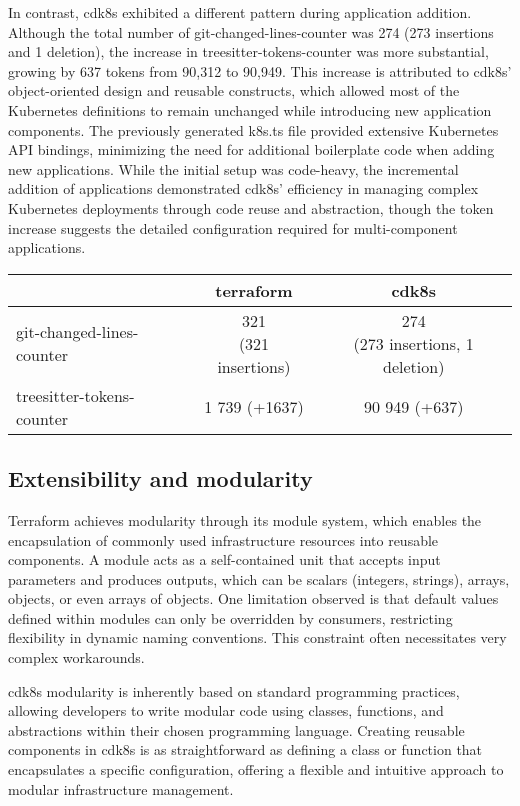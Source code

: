 \documentclass{article}
\begin{document}
In contrast, cdk8s exhibited a different pattern during application addition. Although the total number of git-changed-lines-counter was 274 (273 insertions and 1 deletion), the increase in treesitter-tokens-counter was more substantial, growing by 637 tokens from 90,312 to 90,949. This increase is attributed to cdk8s’ object-oriented design and reusable constructs, which allowed most of the Kubernetes definitions to remain unchanged while introducing new application components. The previously generated k8s.ts file provided extensive Kubernetes API bindings, minimizing the need for additional boilerplate code when adding new applications. While the initial setup was code-heavy, the incremental addition of applications demonstrated cdk8s’ efficiency in managing complex Kubernetes deployments through code reuse and abstraction, though the token increase suggests the detailed configuration required for multi-component applications.

\begin{center}
    \begin{tabular}{l | cc} 
        & terraform & cdk8s \\
        \hline
        git-changed-lines-counter & \makecell{321 \\ (321 insertions)} & \makecell{274 \\ (273 insertions, 1 deletion)} \\
        treesitter-tokens-counter & 1 739 (+1637) & 90 949 (+637) \\
    \end{tabular} 
\end{center}

\subsection{Extensibility and modularity}
Terraform achieves modularity through its module system, which enables the encapsulation of commonly used infrastructure resources into reusable components. A module acts as a self-contained unit that accepts input parameters and produces outputs, which can be scalars (integers, strings), arrays, objects, or even arrays of objects. One limitation observed is that default values defined within modules can only be overridden by consumers, restricting flexibility in dynamic naming conventions. This constraint often necessitates very complex workarounds.

cdk8s modularity is inherently based on standard programming practices, allowing developers to write modular code using classes, functions, and abstractions within their chosen programming language. Creating reusable components in cdk8s is as straightforward as defining a class or function that encapsulates a specific configuration, offering a flexible and intuitive approach to modular infrastructure management.
\end{document}
